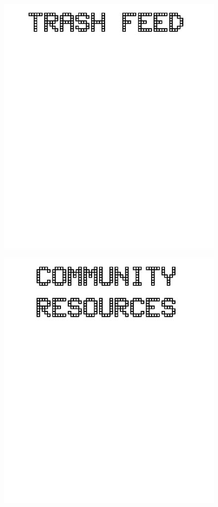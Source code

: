 \documentclass[17pt]{extreport}
\begin{document}
	\begin{figure}
		\centering
		\includegraphics[width=7.5in]{imageserver/uploadimages/trashfeed.png}
	\end{figure}
	\begin{figure}
		\centering
		\includegraphics[width=6.25in]{imageserver/uploadimages/community.png}
	\end{figure}	
\end{document}
